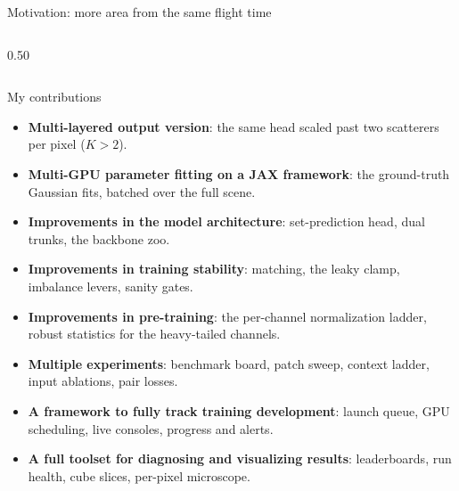 \documentclass[aspectratio=169,9pt]{beamer}
\begin{document}
\begin{frame}{Motivation: more area from the same flight time}
\begin{columns}[c]
\begin{column}{0.50\textwidth}
{}
    \end{column}
  \end{columns}
\end{frame}

\begin{frame}{My contributions}
  \begin{itemize}\setlength{\itemsep}{8pt}
    \item \textbf{Multi-layered output version}: the same head scaled past two scatterers per pixel ($K>2$).
    \item \textbf{Multi-GPU parameter fitting on a JAX framework}: the ground-truth Gaussian fits, batched over the full scene.
    \item \textbf{Improvements in the model architecture}: set-prediction head, dual trunks, the backbone zoo.
    \item \textbf{Improvements in training stability}: matching, the leaky clamp, imbalance levers, sanity gates.
    \item \textbf{Improvements in pre-training}: the per-channel normalization ladder, robust statistics for the heavy-tailed channels.
    \item \textbf{Multiple experiments}: benchmark board, patch sweep, context ladder, input ablations, pair losses.
    \item \textbf{A framework to fully track training development}: launch queue, GPU scheduling, live consoles, progress and alerts.
    \item \textbf{A full toolset for diagnosing and visualizing results}: leaderboards, run health, cube slices, per-pixel microscope.
  \end{itemize}
\end{frame}
\end{document}
